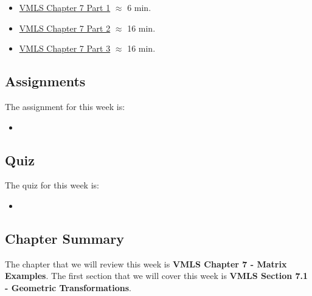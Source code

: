 \begin{itemize}
    \item \href{https://www.youtube.com/watch?v=jXN50fuRSqE}{VMLS Chapter 7 Part 1} $\approx$ 6 min.
    \item \href{https://www.youtube.com/watch?v=v7CH2ry-vrQ}{VMLS Chapter 7 Part 2} $\approx$ 16 min.
    \item \href{https://www.youtube.com/watch?v=kTg0vKppOl8}{VMLS Chapter 7 Part 3} $\approx$ 16 min.
\end{itemize}

\subsection{Assignments}

The assignment for this week is:

\begin{itemize}
    \item {}
\end{itemize}

\subsection{Quiz}

The quiz for this week is:

\begin{itemize}
    \item {}
\end{itemize}

\subsection{Chapter Summary}

The chapter that we will review this week is \textbf{VMLS Chapter 7 - Matrix Examples}. The first section that we will cover this week is \textbf{VMLS Section 7.1 - Geometric Transformations}.


